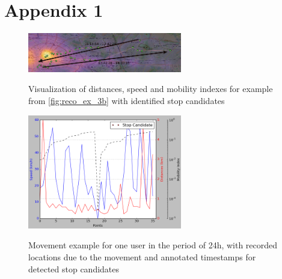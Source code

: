 \chapter{Appendix 1}
\label{appendix:add_example_1}

\begin{figure}[!ht]
	\centering
	\includegraphics[width=0.6\textwidth]{images/reco_example_3a.png}\\
	\caption{ Visualization of distances, speed and mobility indexes for example from \autoref{fig:reco_ex_3b} with identified stop candidates }
	\label{fig:reco_ex_3a}
\end{figure} 
\begin{figure}[!ht]
	\centering
	\includegraphics[width=0.6\textwidth]{images/reco_example_3b.png}\\
	\caption{ Movement example for one user in the period of 24h, with recorded locations due to the movement and annotated timestamps for detected stop candidates }
	\label{fig:reco_ex_3b}
\end{figure}